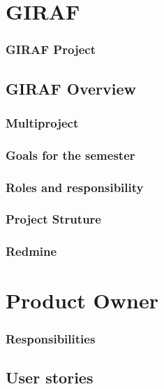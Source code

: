\section{GIRAF}
\begin{frame}
	\frametitle{GIRAF Project}
\end{frame}

\subsection{GIRAF Overview}

\begin{frame}
  \begin{center}
	\frametitle{Multiproject}
  \end{center}
\end{frame}

\begin{frame}
	\begin{center}
		\frametitle{Goals for the semester}
	\end{center}
\end{frame}

\begin{frame}
	\begin{center}
		\frametitle{Roles and responsibility}
	\end{center}
\end{frame}

\begin{frame}
	\begin{center}
		\frametitle{Project Struture}
	\end{center}
\end{frame}

\begin{frame}
	\begin{center}
		\frametitle{Redmine}
	\end{center}
\end{frame}

\section{Product Owner}

\begin{frame}
	\begin{center}
		\frametitle{Responsibilities}
	\end{center}
\end{frame}

\subsection{User stories}

